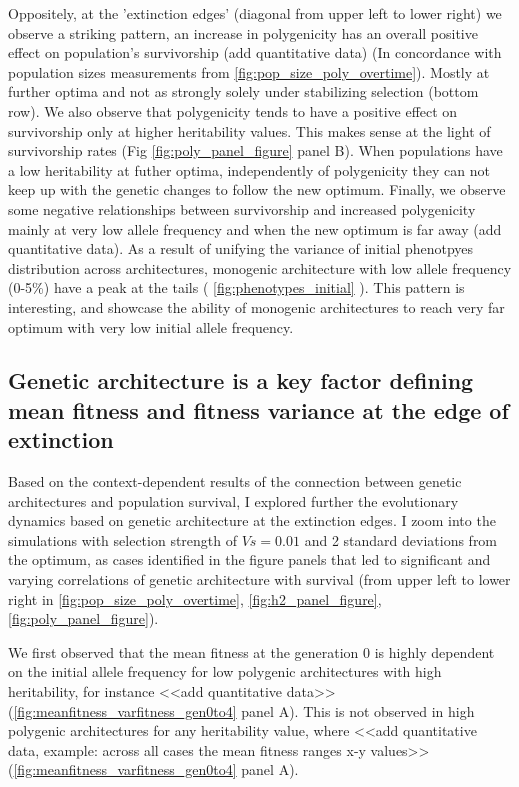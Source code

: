 \documentclass{article}
\begin{document}
Oppositely, at the 'extinction edges' (diagonal from upper left to lower right) we observe a striking pattern, an increase in polygenicity has an overall positive effect on population's survivorship (add quantitative data) (In concordance with population sizes measurements from \ref{fig:pop_size_poly_overtime}). Mostly at further optima and not as strongly solely under stabilizing selection (bottom row). We also observe that polygenicity tends to have a positive effect on survivorship only at higher heritability values. This makes sense at the light of survivorship rates (Fig \ref{fig:poly_panel_figure} panel B). When populations have a low heritability at futher optima, independently of polygenicity they can not keep up with the genetic changes to follow the new optimum. Finally, we observe some negative relationships between survivorship and increased polygenicity mainly at very low allele frequency and when the new optimum is far away (add quantitative data). As a result of unifying the variance of initial phenotpyes distribution across architectures, monogenic architecture with low allele frequency (0-5\%) have a peak at the tails ( \ref{fig:phenotypes_initial} ). This pattern is interesting, and showcase the ability of monogenic architectures to reach very far optimum with very low initial allele frequency. 

\subsection{Genetic architecture is a key factor defining mean fitness and fitness variance at the edge of extinction}

Based on the context-dependent results of the connection between genetic architectures and population survival, I explored further the evolutionary dynamics based on genetic architecture at the extinction edges. I zoom into the simulations with selection strength of $Vs=0.01$  and 2 standard deviations from the optimum, as cases identified in the figure panels that led to significant and varying correlations of genetic architecture with survival (from upper left to lower right in \ref{fig:pop_size_poly_overtime}, \ref{fig:h2_panel_figure}, \ref{fig:poly_panel_figure}). 

We first observed that the mean fitness at the generation 0 is highly dependent on the initial allele frequency for low polygenic architectures with high heritability, for instance <<add quantitative data>> (\ref{fig:meanfitness_varfitness_gen0to4} panel A). This is not observed in  high polygenic architectures for any heritability value, where <<add quantitative data, example: across all cases the mean fitness ranges x-y values>> (\ref{fig:meanfitness_varfitness_gen0to4} panel A). 
\end{document}
